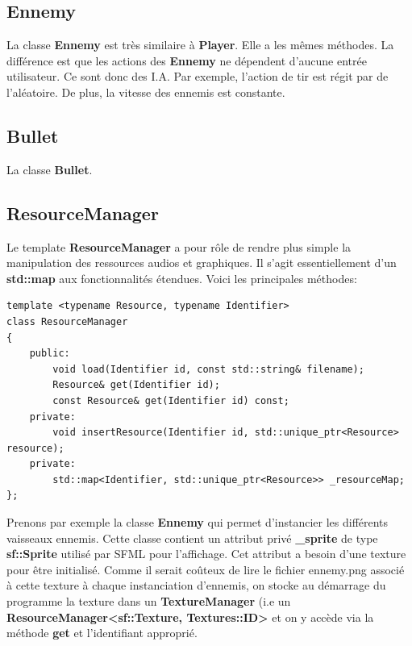 \documentclass{article}
\begin{document}
\subsection{Ennemy}

La classe \textbf{Ennemy} est très similaire à \textbf{Player}. Elle a les mêmes méthodes. La différence est que les actions des \textbf{Ennemy} ne dépendent d'aucune entrée utilisateur. Ce sont donc des I.A. Par exemple, l'action de tir est régit par de l'aléatoire. De plus, la vitesse des ennemis est constante.

\subsection{Bullet}

La classe \textbf{Bullet}.


\subsection{ResourceManager}

Le template \textbf{ResourceManager} a pour rôle de rendre plus simple la manipulation des ressources audios et graphiques. Il s'agit essentiellement d'un \textbf{std::map} aux fonctionnalités étendues. Voici les principales méthodes:

\begin{verbatim} 
template <typename Resource, typename Identifier>
class ResourceManager
{
    public:
        void load(Identifier id, const std::string& filename);
        Resource& get(Identifier id);
        const Resource& get(Identifier id) const;
    private:
        void insertResource(Identifier id, std::unique_ptr<Resource> resource);
    private:
        std::map<Identifier, std::unique_ptr<Resource>>	_resourceMap;
};
\end{verbatim}



Prenons par exemple la classe \textbf{Ennemy} qui permet d'instancier les différents vaisseaux ennemis. Cette classe contient un attribut privé \textbf{\_sprite} de type \textbf{sf::Sprite} utilisé par SFML pour l'affichage. Cet attribut a besoin d'une texture pour être initialisé. Comme il serait coûteux de lire le fichier ennemy.png associé à cette texture à chaque instanciation d'ennemis, on stocke au démarrage du programme la texture dans un \textbf{TextureManager} (i.e un \textbf{ResourceManager<sf::Texture, Textures::ID>} et on y accède via la méthode \textbf{get} et l'identifiant approprié.
\end{document}
